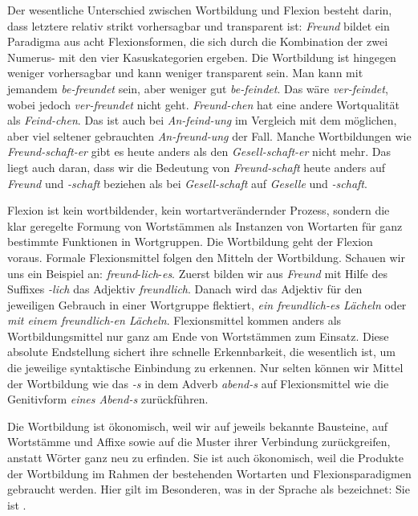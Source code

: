 Der wesentliche Unterschied zwischen Wortbildung und Flexion besteht darin, dass letztere relativ strikt vorhersagbar und transparent ist: \textit{Freund} bildet ein Paradigma aus acht Flexionsformen, die sich durch die Kombination der zwei Numerus- mit den vier Kasuskategorien ergeben. Die Wortbildung ist hingegen weniger vorhersagbar und kann weniger transparent sein. Man kann mit jemandem \textit{be-freundet} sein, aber weniger gut \textit{be-feindet}. Das wäre \textit{ver-feindet}, wobei jedoch \textit{ver-freundet} nicht geht. \textit{Freund-chen} hat eine andere Wortqualität als \textit{Feind-chen}. Das ist auch bei \textit{An-feind-ung} im Vergleich mit dem möglichen, aber viel seltener gebrauchten \textit{An-freund-ung} der Fall. Manche Wortbildungen wie \textit{Freund-schaft-er} gibt es heute anders als den \textit{Gesell-schaft-er} nicht mehr. Das liegt auch daran, dass wir die Bedeutung von \textit{Freund-schaft} heute anders auf \textit{Freund} und \textit{-schaft} beziehen als bei \textit{Gesell-schaft} auf \textit{Geselle} und \textit{-schaft}.

Flexion ist kein wortbildender, kein wortartverändernder Prozess, sondern die klar geregelte Formung von Wortstämmen als Instanzen von Wortarten für ganz bestimmte Funktionen in Wortgruppen. Die Wortbildung geht der Flexion voraus. Formale Flexionsmittel folgen den Mitteln der Wortbildung. Schauen wir uns ein Beispiel an: \textit{freund}-\textit{lich}-\textit{es}. Zuerst bilden wir aus \textit{Freund} mit Hilfe des Suffixes \textit{-lich} das Adjektiv \textit{freundlich}. Danach wird das Adjektiv für den jeweiligen Gebrauch in einer Wortgruppe flektiert, \zB \textit{ein freundlich-es Lächeln} oder \textit{mit einem freundlich-en Lächeln}. Flexionsmittel kommen anders als Wortbildungsmittel nur ganz am Ende von Wortstämmen zum Einsatz. Diese absolute Endstellung sichert ihre schnelle Erkennbarkeit, die wesentlich ist, um die jeweilige syntaktische Einbindung zu erkennen. Nur selten können wir Mittel der Wortbildung wie das \textit{-s} in dem Adverb \textit{abend-s} auf Flexionsmittel wie die Genitivform \textit{eines Abend-s} zurückführen.

Die Wortbildung ist ökonomisch, weil wir auf jeweils bekannte Bausteine, auf Wortstämme und Affixe sowie auf die Muster ihrer Verbindung zurückgreifen, anstatt Wörter ganz neu zu erfinden. Sie ist auch ökonomisch, weil die Produkte der Wortbildung im Rahmen der bestehenden Wortarten und Flexionsparadigmen gebraucht werden. Hier gilt im Besonderen, was \citet[42]{Humboldt1836} in der Sprache als  bezeichnet: Sie ist . 

